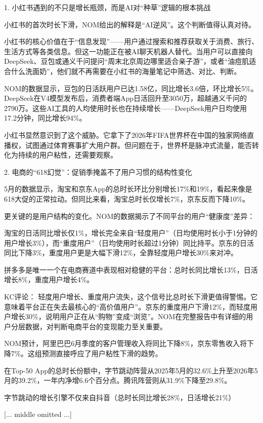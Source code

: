 \documentclass[11pt]{ctexart}
\begin{document}
1. 小红书遇到的不只是增长瓶颈，而是AI对“种草”逻辑的根本挑战

小红书的首次时长下滑，NOM给出的解释是“AI逆风”。这个判断值得认真对待。

小红书的核心价值在于“信息发现”——用户通过搜索和推荐获取关于消费、旅行、生活方式等各类信息。但这一功能正在被AI聊天机器人替代。当用户可以直接向DeepSeek、豆包或通义千问提问“周末北京周边哪里适合亲子游”，或者“油痘肌适合什么洗面奶”，他们就不再需要在小红书的海量笔记中筛选、对比、判断。

NOM的数据显示，豆包的日活跃用户已达1.58亿，同比增长3.6倍，环比增长5\%。DeepSeek在V4模型发布后，消费者端App日活回升至3050万，超越通义千问的2790万。这些AI工具的人均使用时长也在持续增长——DeepSeek用户日均使用17.2分钟，同比增长94\%。

小红书显然意识到了这个威胁。它拿下了2026年FIFA世界杯在中国的独家网络直播权，试图通过体育赛事扩大用户群。但问题在于，世界杯是脉冲式流量，能否转化为持续的用户粘性，还需要观察。

2. 电商的“618幻觉”：促销季掩盖不了用户习惯的结构性变化

5月的数据显示，淘宝和京东App的总时长环比分别增长17\%和19\%，看起来像是618大促的正常拉动。但同比来看，淘宝总时长仅增长7\%，京东反而下降10\%。

更关键的是用户结构的变化。NOM的数据揭示了不同平台的用户“健康度”差异：

淘宝的日活同比增长仅1\%，增长完全来自“轻度用户”（日均使用时长小于1分钟的用户增长3\%），而“重度用户”（日均使用时长超过1分钟）同比持平。京东的日活同比下降3\%，重度用户更是大幅下滑12\%，全靠轻度用户增长30\%来对冲。

拼多多是唯一一个在电商赛道中表现相对稳健的平台：总时长同比增长13\%，日活增长8\%，重度用户增长4\%。

KC评论： 轻度用户增长、重度用户流失，这个信号比总时长下滑更值得警惕。它意味着平台正在失去最核心的“高价值用户”。京东的重度用户下滑12\%，而轻度用户增长30\%，说明用户正在从“购物”变成“浏览”。NOM在完整报告中有详细的用户分层数据，对判断电商平台的变现能力至关重要。

NOM预计，阿里巴巴6月季度的客户管理收入将同比下降8\%，京东零售收入将下降7\%。这组预测直接呼应了用户粘性下滑的趋势。

在Top-50 App的总时长份额中，字节跳动阵营从2025年5月的32.6\%上升至2026年5月的39.2\%，一年内净增6.6个百分点。腾讯阵营则从31.9\%下降至29.8\%。

字节跳动的增长引擎不仅来自抖音（总时长同比增长28\%，日活增长21\%）

[... middle omitted ...]
\end{document}
